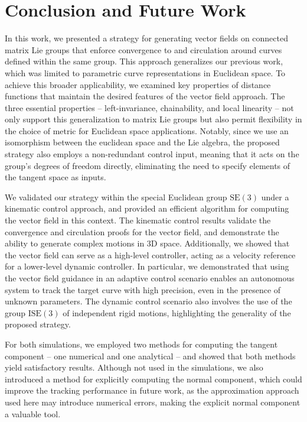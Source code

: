\chapter{Conclusion and Future Work}\label{ch:conclusion}
In this work, we presented a strategy for generating vector fields on connected matrix Lie groups that enforce convergence to and circulation around curves defined within the same group. This approach generalizes our previous work, which was limited to parametric curve representations in Euclidean space. To achieve this broader applicability, we examined key properties of distance functions that maintain the desired features of the vector field approach. The three essential properties -- left-invariance, chainability, and local linearity -- not only support this generalization to matrix Lie groups but also permit flexibility in the choice of metric for Euclidean space applications. Notably, since we use an isomorphism between the euclidean space and the Lie algebra, the proposed strategy also employs a non-redundant control input, meaning that it acts on the group's degrees of freedom directly, eliminating the need to specify elements of the tangent space as inputs.

We validated our strategy within the special Euclidean group $\text{SE}(3)$ under a kinematic control approach, and provided an efficient algorithm for computing the vector field in this context. The kinematic control results validate the convergence and circulation proofs for the vector field, and demonstrate the ability to generate complex motions in 3D space. Additionally, we showed that the vector field can serve as a high-level controller, acting as a velocity reference for a lower-level dynamic controller. In particular, we demonstrated that using the vector field guidance in an adaptive control scenario enables an autonomous system to track the target curve with high precision, even in the presence of unknown parameters. The dynamic control scenario also involves the use of the group $\text{ISE}(3)$ of independent rigid motions, highlighting the generality of the proposed strategy.

For both simulations, we employed two methods for computing the tangent component -- one numerical and one analytical -- and showed that both methods yield satisfactory results. Although not used in the simulations, we also introduced a method for explicitly computing the normal component, which could improve the tracking performance in future work, as the approximation approach used here may introduce numerical errors, making the explicit normal component a valuable tool.

